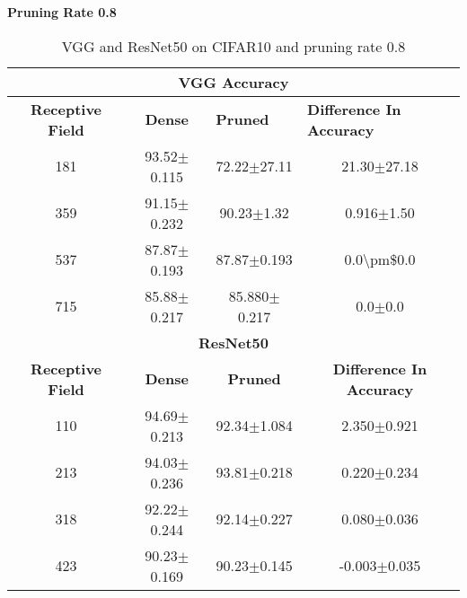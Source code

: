 \textbf{Pruning Rate 0.8}
\begin{table}[H]
  \centering
\begin{tabular}{@{}cccc@{}}
\toprule
\multicolumn{4}{c}{\textbf{VGG Accuracy}}                                                                                                                                  \\ \midrule
\textbf{Receptive Field} & \textbf{Dense} & \multicolumn{1}{l}{\textbf{Pruned} } & \multicolumn{1}{l}{\textbf{Difference In Accuracy}} \\ \midrule
181                      & 93.52$\pm$0.115              & 72.22$\pm$27.11                                   & 21.30$\pm$27.18                                     \\
359                      & 91.15$\pm$0.232              & 90.23$\pm$1.32                                    & 0.916$\pm$1.50                                      \\
537                      & 87.87$\pm$0.193              & 87.87$\pm$0.193                                   & 0.0\textbackslash{}pm\$0.0                          \\
715                      & 85.88$\pm$0.217              & 85.880$\pm$0.217                                  & 0.0$\pm$0.0                                         \\ \midrule
\multicolumn{4}{c}{\textbf{ResNet50}}                                                                                                                             \\ \midrule
\textbf{Receptive Field} & \textbf{Dense} & \textbf{Pruned}                     & \textbf{Difference In Accuracy}                     \\
110                      & 94.69$\pm$0.213              & 92.34$\pm$1.084                                   & 2.350$\pm$0.921                                     \\
213                      & 94.03$\pm$0.236              & 93.81$\pm$0.218                                   & 0.220$\pm$0.234                                     \\
318                      & 92.22$\pm$0.244              & 92.14$\pm$0.227                                   & 0.080$\pm$0.036                                     \\
423                      & 90.23$\pm$0.169              & 90.23$\pm$0.145                                   & -0.003$\pm$0.035                                    \\ \bottomrule
\end{tabular}
\caption{VGG and ResNet50 on CIFAR10 and pruning rate 0.8}
\label{tab:cifar10 pruning rate08}
\end{table}

